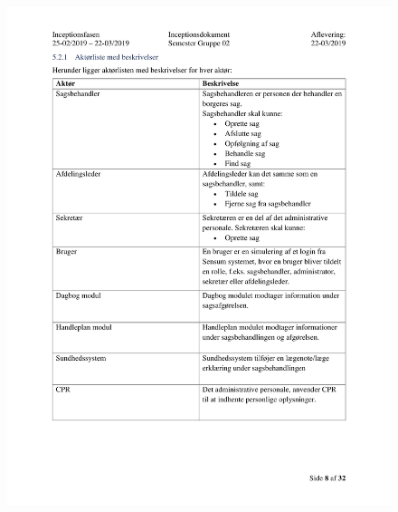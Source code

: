 \begin{figure}[hb]
  \includegraphics[scale = 0.33]{./PNG/Inceptions/Gruppe02+InceptionsDokument-09.jpg} 
\end{figure}

